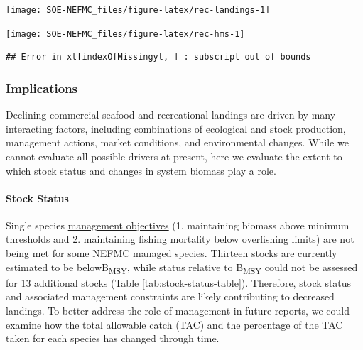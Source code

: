 \documentclass[
  10pt,
]{article}
\let\origfigure\figure
\let\endorigfigure\endfigure
\renewenvironment{figure}[1][2] {
    \expandafter\origfigure\expandafter[H]
} {
    \endorigfigure
}
\begin{document}
\begin{figure}

{\centering \texttt{[image: SOE-NEFMC\_files/figure-latex/rec-landings-1]} 

}

\caption{Total recreational seafood harvest (millions of pounds) in the New England region.}\label{fig:rec-landings}
\end{figure}

\begin{figure}

{\centering \texttt{[image: SOE-NEFMC\_files/figure-latex/rec-hms-1]} 

}

\caption{Recreational shark landings from Marine Recreational Information Program (left) and Large Pelagics Survey (right)}\label{fig:rec-hms}
\end{figure}

\begin{verbatim}
## Error in xt[indexOfMissingyt, ] : subscript out of bounds
\end{verbatim}

\hypertarget{implications}{%
\subsubsection{Implications}\label{implications}}

Declining commercial seafood and recreational landings are driven by many interacting factors, including combinations of ecological and stock production, management actions, market conditions, and environmental changes. While we cannot evaluate all possible drivers at present, here we evaluate the extent to which stock status and changes in system biomass play a role.

\hypertarget{stock-status}{%
\paragraph{Stock Status}\label{stock-status}}

Single species \href{https://noaa-edab.github.io/catalog/stock_status.html}{management objectives} (1. maintaining biomass above minimum thresholds and 2. maintaining fishing mortality below overfishing limits) are not being met for some NEFMC managed species. Thirteen stocks are currently estimated to be belowB\textsubscript{MSY}, while status relative to B\textsubscript{MSY} could not be assessed for 13 additional stocks (Table \ref{tab:stock-status-table}). Therefore, stock status and associated management constraints are likely contributing to decreased landings. To better address the role of management in future reports, we could examine how the total allowable catch (TAC) and the percentage of the TAC taken for each species has changed through time.
\end{document}
